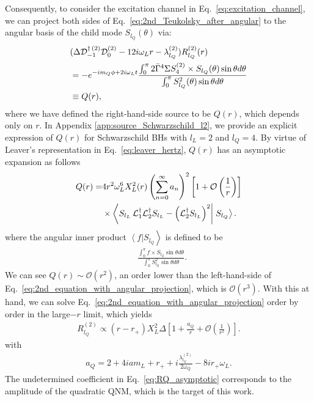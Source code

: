 \documentclass[aps,prd,amsmath,floats,floatfix, twocolumn,
superscriptaddress,nofootinbib,showpacs]{revtex4-1}
\begin{document}
Consequently, to consider the excitation channel in Eq.~\eqref{eq:excitation_channel}, we can project both sides of Eq.~\eqref{eq:2nd_Teukolsky_after_angular} to the  angular basis of the child mode $S_{l_Q}(\theta)$ via:
\begin{align}
    & (\Delta \mathcal{D}_{-1}^{\dagger\,(2)}\mathcal{D}^{(2)}_0-12i\omega_L r-\lambda^{(2)}_{l_Q}) R_{l_Q}^{(2)}(r) \notag \\
    &=-e^{-im_Q\phi + 2i\omega_L t} \frac{\int_0^\pi2\bar{\Gamma}^4\Sigma S_4^{(2)} \times S_{l_{Q}}(\theta) \sin\theta d\theta}{\int_0^\pi S^2_{l_{Q}}(\theta) \sin\theta d\theta} \notag \\
    &\equiv Q(r), \label{eq:2nd_equation_with_angular_projection}
\end{align}
where we have defined the right-hand-side source to be $Q(r)$, which depends only on $r$. In Appendix \ref{app:source_Schwarzschild_l2}, we provide an explicit expression of $Q(r)$ for Schwarzschild BHs with $l_L=2$ and $l_Q=4$. By virtue of Leaver's representation in Eq.~\eqref{eq:leaver_hertz}, $Q(r)$ has an asymptotic expansion as follows 
\begin{align}
    Q(r)=&4r^2\omega_L^6X^2_L(r)\left(\sum^\infty_{n=0} a_n\right)^2 \left[1+\mathcal{O}\left(\frac{1}{r}\right)\right] \notag \\
    &\times\left<S_{l_L}\,\mathcal{L}_1^\dagger\mathcal{L}_2^\dagger S_{l_L}-\left(\mathcal{L}_2^\dagger S_{l_L}\right)^2\right|\left.S_{l_{Q}}\right>. \label{eq:Q_asymptotic_expansion}
\end{align}
where the angular inner product $\left<f\right|\left.S_{l_{Q}}\right>$ is defined to be
\begin{align}
    &\frac{\int_{0}^{ \pi} f\times S_{l_{Q}} \sin\theta d\theta}{\int_0^\pi S^2_{l_{Q}} \sin\theta d\theta}.  \label{eq:angular_inner_product}
\end{align}
We can see $Q(r)\sim \mathcal{O}(r^{2})$, an order lower than the left-hand-side of Eq.~\eqref{eq:2nd_equation_with_angular_projection}, which is $\mathcal{O}(r^3)$. With this at hand, we can solve Eq.~\eqref{eq:2nd_equation_with_angular_projection} order by order in the large$-r$ limit, which yields
\begin{align}
    R_{l_Q}^{(2)}\propto (r-r_+)X_L^2\Delta \left[1+\frac{a_Q}{r}+\mathcal{O}\left(\frac{1}{r^2}\right)\right]. \label{eq:RQ_asymptotic}
\end{align}
with
\begin{align}
    a_Q=2+4iam_L+r_++i\frac{\lambda^{(2)}_{l_Q}}{2\omega_Q}-8ir_+\omega_L.
\end{align}
The undetermined coefficient in Eq.~\eqref{eq:RQ_asymptotic} corresponds to the amplitude of the quadratic QNM, which is the target of this work.
\end{document}
